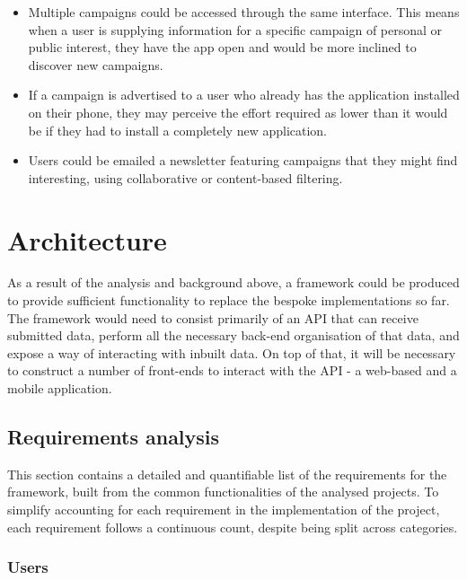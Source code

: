 \documentclass{article}
\let\oldsection\section
\renewcommand\section{\clearpage\oldsection}
\begin{document}
\begin{enumerate}
			\begin{itemize}
				\item Multiple campaigns could be accessed through the same interface. This means when a user is supplying information for a specific campaign of personal or public interest, they have the app open and would be more inclined to discover new campaigns.
				\item If a campaign is advertised to a user who already has the application installed on their phone, they may perceive the effort required as lower than it would be if they had to install a completely new application.
				\item Users could be emailed a newsletter featuring campaigns that they might find interesting, using collaborative or content-based filtering.
			\end{itemize}
		\end{enumerate}

	\section{Architecture}
	\label{sec:architecture}
		As a result of the analysis and background above, a framework could be produced to provide sufficient functionality to replace the bespoke implementations so far. The framework would need to consist primarily of an API that can receive submitted data, perform all the necessary back-end organisation of that data, and expose a way of interacting with inbuilt data. On top of that, it will be necessary to construct a number of front-ends to interact with the API - a web-based and a mobile application.

		\subsection{Requirements analysis}

		This section contains a detailed and quantifiable list of the requirements for the framework, built from the common functionalities of the analysed projects. To simplify accounting for each requirement in the implementation of the project, each requirement follows a continuous count, despite being split across categories.

		\newcommand\rqrn{\stepcounter{requirementcounter}\arabic{requirementcounter}}

		\subsubsection{Users}
\end{document}
